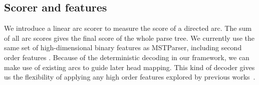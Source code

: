 \subsection{Scorer and features}
We introduce a linear arc scorer to measure the score of a directed arc.
The sum of all arc scores gives the final score of the whole parse tree.
We currently use the same set of high-dimensional binary features as MSTParser,
including second order features \cite{mcdonald2006online}.
Because of the deterministic decoding in our framework,
we can make use of existing arcs to guide later head mapping.
This kind of decoder gives us the flexibility of applying any
high order features explored by previous
works~\cite{carreras2007experiments,koo2010efficient,ma2012fourth}.

